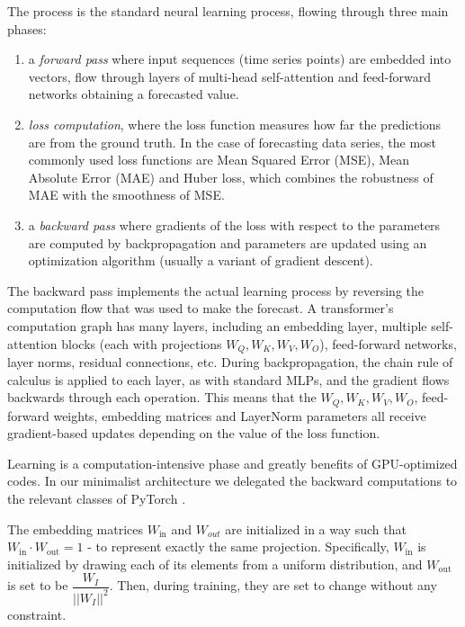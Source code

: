 \documentclass[algorithms,article,submit,pdftex,moreauthors]{Definitions/mdpi}
\begin{document}
The process is the standard neural learning process, flowing through three main phases:
\begin{enumerate}
    \item a {\it forward pass} where input sequences (time series points) are embedded into vectors, flow through layers of multi-head self-attention and feed-forward networks obtaining a forecasted value.

    \item {\it loss computation}, where the loss function measures how far the predictions are from the ground truth. In the case of forecasting data series, the most commonly used loss functions are Mean Squared Error (MSE), Mean Absolute Error (MAE) and Huber loss, which combines the robustness of MAE with the smoothness of MSE.

    \item a {\it backward pass} where gradients of the loss with respect to the parameters are computed by backpropagation and parameters are updated using an optimization algorithm (usually a variant of gradient descent).
\end{enumerate}

The backward pass implements the actual learning process by reversing the computation flow that was used to make the forecast. A transformer's computation graph has many layers, including an embedding layer, multiple self-attention blocks (each with projections $W_Q, W_K, W_V, W_O$), feed-forward networks, layer norms, residual connections, etc. During backpropagation, the chain rule of calculus is applied to each layer, as with standard MLPs, and the gradient flows backwards through each operation. This means that the $W_Q, W_K, W_V, W_O$, feed-forward weights, embedding matrices and LayerNorm parameters all receive gradient-based updates depending on the value of the loss function.

Learning is a computation-intensive phase and greatly benefits of GPU-optimized codes. In our minimalist architecture we delegated the backward computations to the relevant classes of PyTorch \cite{PyTorch25}.

The embedding matrices $W_\text{in}$ and $W_{out}$ are initialized in a way such that $W_\text{in} \cdot W_\text{out} = 1$ - to represent exactly the same projection. Specifically, $W_\text{in}$ is initialized by drawing each of its elements from a uniform distribution, and $W_\text{out}$ is set to be $\dfrac{W_I}{||W_I||^2}$. Then, during training, they are set to change without any constraint.
\end{document}
